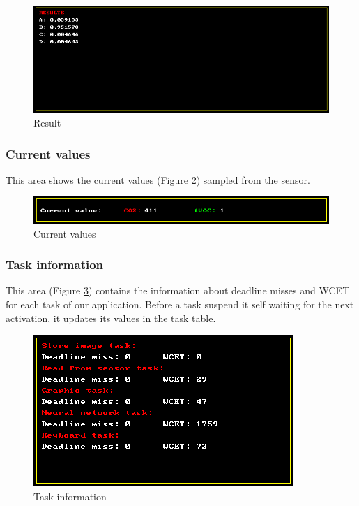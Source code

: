 \documentclass[12pt]{article}
\begin{document}
\begin{figure}[H]
    \centering
    \includegraphics[width=\textwidth]{images/results.png}
    \caption{Result}
    \label{results}
\end{figure}

\subsubsection*{Current values}
This area shows the current values (Figure \ref{values}) sampled from the sensor.

\begin{figure}[H]
    \centering
    \includegraphics[width=\textwidth]{images/values.png}
    \caption{Current values}
    \label{values}
\end{figure}

\subsubsection*{Task information}
This area (Figure \ref{task_info}) contains the information about deadline
misses and WCET for each task of our application. Before a task suspend it self
waiting for the next activation, it updates its values in the task table.

\begin{figure}[H]
    \centering
    \includegraphics[scale=0.75]{images/task_info.png}
    \caption{Task information}
    \label{task_info}
\end{figure}
\end{document}
